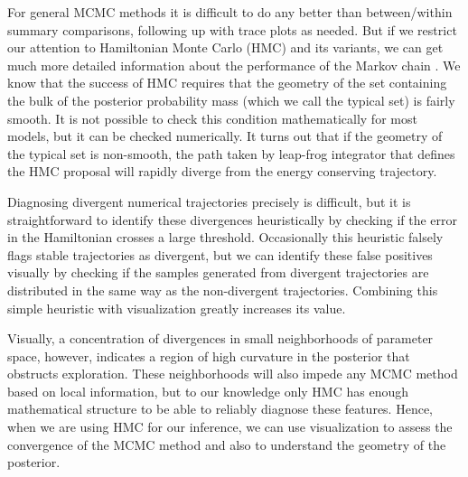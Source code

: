 \documentclass{statsoc}
\begin{document}
For general MCMC methods it is difficult to do any better than between/within
summary comparisons, following up with trace plots as needed.  But if we
restrict our attention to Hamiltonian Monte Carlo (HMC) and its variants, we can
get much more detailed information about the performance of the Markov chain
\citep{betancourt2017conceptual}. We know that the success of HMC requires that
the geometry of the set containing the bulk of the posterior probability mass
(which we call the typical set)  is fairly smooth. It is not possible to check
this condition mathematically for most models, but it can be checked
numerically. It turns out that if the geometry of the typical set is non-smooth,
the  path taken by leap-frog integrator that defines the HMC proposal will
rapidly diverge from the energy conserving trajectory.

Diagnosing divergent numerical trajectories precisely is difficult, but it is
straightforward to identify these divergences heuristically by checking if the
error in the Hamiltonian crosses a large threshold. Occasionally this heuristic
falsely flags stable trajectories as divergent, but we can identify these false
positives visually by checking if the samples generated from divergent
trajectories are distributed in the same way as the non-divergent trajectories.
Combining this simple heuristic with visualization greatly increases its value.

Visually, a concentration of divergences in small neighborhoods of parameter
space, however, indicates a region of high curvature in the posterior that
obstructs exploration.  These neighborhoods will also impede any  MCMC method
based on local information, but to our knowledge only HMC has enough
mathematical structure to be able to reliably diagnose these features. Hence,
when we are using HMC for our inference, we can use visualization to
assess the convergence of the MCMC method and also to understand the 
geometry of the posterior.
\end{document}
